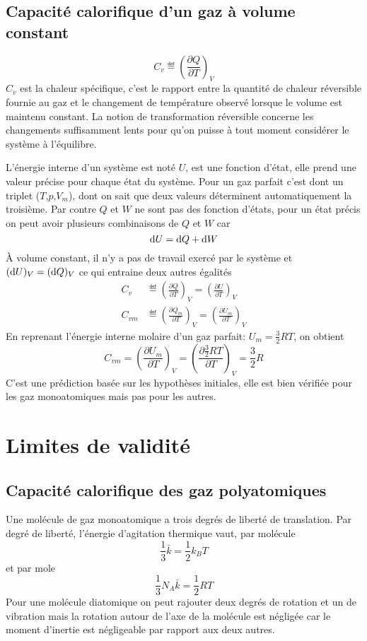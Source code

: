 \subsection{Capacité calorifique d'un gaz à volume constant}
\[ C_v \eqdef \left(\frac{\partial Q}{\partial T} \right)_V \]
$C_v$ est la chaleur spécifique,
c'est le rapport entre la quantité de chaleur réversible fournie au gaz et
le changement de température observé lorsque le volume est maintenu constant.
La notion de transformation réversible concerne les changements suffisamment
lents pour qu'on puisse à tout moment considérer le système à l'équilibre.

L'énergie interne d'un système est noté $U$, est une fonction d'état,
elle prend une valeur précise pour chaque état du système.
Pour un gaz parfait c'est dont un triplet ($T$,$p$,$V_m$),
dont on sait que deux valeurs déterminent automatiquement la troisième.
Par contre $Q$ et $W$ ne sont pas des fonction d'états,
pour un état précis on peut avoir plusieurs combinaisons de $Q$ et $W$ car
\[ \operatorname{d}\! U = \operatorname{d}\! Q + \operatorname{d}\! W \]
À volume constant, il n'y a pas de travail exercé par le système et
$(\operatorname{d}\! U)_V = (\operatorname{d}\! Q)_V$ ce qui entraine deux autres égalités
\begin{align*}
  C_v & \eqdef \left(\frac{\partial Q}{\partial T} \right)_V =
  \left(\frac{\partial U}{\partial T} \right)_V\\
  C_{vm} & \eqdef \left(\frac{\partial Q_m}{\partial T} \right)_V =
  \left(\frac{\partial U_m}{\partial T} \right)_V
\end{align*}
En reprenant l'énergie interne molaire d'un gaz parfait:
$U_m = \frac 32 RT$, on obtient
\[ C_{vm} = \left(\frac{\partial U_m}{\partial T} \right)_V =
\left(\frac{\partial \frac 32 RT}{\partial T}\right)_V = \frac 32R \]
C'est une prédiction basée sur les hypothèses initiales,
elle est bien vérifiée pour les gaz monoatomiques mais pas pour les autres.

\section{Limites de validité}
\subsection{Capacité calorifique des gaz polyatomiques}
Une molécule de gaz monoatomique a trois degrés de liberté de translation.
Par degré de liberté, l'énergie d'agitation thermique vaut, par molécule
\[ \frac 13 \bar k = \frac 12 k_BT \]
et par mole
\[ \frac 13 N_A \bar k = \frac 12 RT \]
Pour une molécule diatomique on peut rajouter deux degrés de rotation et
un de vibration mais la rotation autour de l'axe de la molécule est négligée
car le moment d'inertie est négligeable par rapport aux deux autres.

